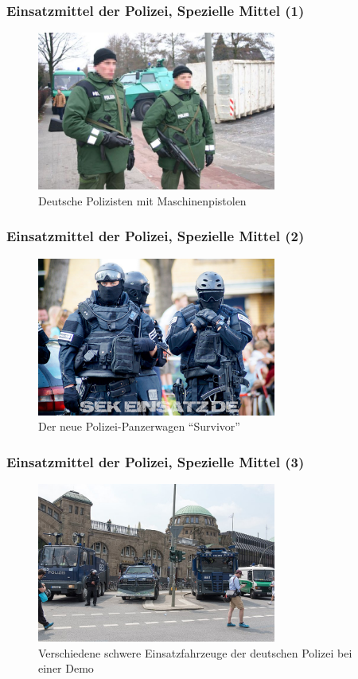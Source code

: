 \documentclass[]{beamer}
\begin{document}
	\begin{frame}
	\frametitle{Einsatzmittel der Polizei, Spezielle Mittel (1) }
	\begin{figure}[h!]
		\renewcommand{\figurename}{Foto} 
		\includegraphics[width=0.7\textwidth]{images/spezielle-mittel-waffen1}
		\caption{Deutsche Polizisten mit Maschinenpistolen}
	\end{figure}
\end{frame}	

	\begin{frame}
	\frametitle{Einsatzmittel der Polizei, Spezielle Mittel (2) }
	\begin{figure}[h!]
		\renewcommand{\figurename}{Foto} 
		\includegraphics[width=0.7\textwidth]{images/spezielle-mittel-polizeiausruestung2.jpg}
		\caption{Der neue Polizei-Panzerwagen \enquote{Survivor}}
	\end{figure}
	\end{frame}

	\begin{frame}
	\frametitle{Einsatzmittel der Polizei, Spezielle Mittel (3) }
	\begin{figure}[h!]
		\renewcommand{\figurename}{Foto} 
		\includegraphics[width=0.7\textwidth]{images/spezielle-mittel-polizeifahrzeuge1}
		\caption{Verschiedene schwere Einsatzfahrzeuge der deutschen Polizei bei einer Demo}
	\end{figure}
	\end{frame}
\end{document}
